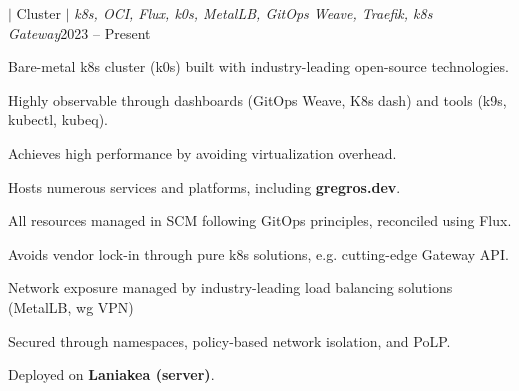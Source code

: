 
\begin{project}{\textbf{\laniakea} $|$ Cluster $|$ \textit{k8s,
    OCI, Flux, k0s, MetalLB, GitOps Weave, Traefik, k8s
Gateway}}{2023 -- Present}
\item Bare-metal k8s cluster (k0s) built with industry-leading
open-source technologies.
\item Highly observable through dashboards (GitOps Weave, K8s dash)
and tools (k9s, kubectl, kubeq).
\item Achieves high performance by avoiding virtualization overhead.
\item Hosts numerous services and platforms, including \textbf{gregros.dev}.
\item All resources managed in SCM following GitOps principles,
reconciled using Flux.
\item Avoids vendor lock-in through pure k8s solutions, e.g.
cutting-edge Gateway API.
\item Network exposure managed by industry-leading load balancing
solutions (MetalLB, wg VPN)
\item Secured through namespaces, policy-based network isolation, and PoLP.
\item Deployed on \textbf{Laniakea (server)}.
\end{project}